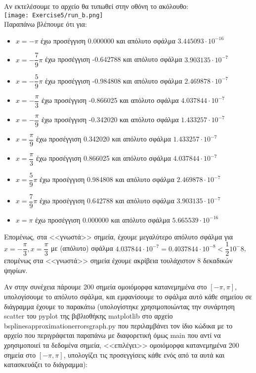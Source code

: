 \documentclass[a4paper,11pt]{article}
\newcommand{\lt}{\latintext}
\begin{document}
\par
Αν εκτελέσουμε το αρχείο θα τυπωθεί στην οθόνη το ακόλουθο:\\
\texttt{[image: Exercise5/run\_b.png]}\\

Παραπάνω βλέπουμε ότι για:\\
\begin{itemize}
    \item {\lt $x = -\pi$} έχω προσέγγιση 0.000000 και απόλυτο σφάλμα $3.445093 \cdot 10^{-16}$
    \item {\lt $x = -\dfrac{7}{9}\pi$} έχω προσέγγιση -0.642788 και απόλυτο σφάλμα $3.903135 \cdot 10^{-7}$
    \item {\lt $x = -\dfrac{5}{9}\pi$} έχω προσέγγιση -0.984808 και απόλυτο σφάλμα $2.469878 \cdot 10^{-7}$
    \item {\lt $x = -\dfrac{\pi}{3}$} έχω προσέγγιση -0.866025 και απόλυτο σφάλμα $4.037844 \cdot 10^{-7}$
    \item {\lt $x = -\dfrac{\pi}{9}$} έχω προσέγγιση -0.342020 και απόλυτο σφάλμα $1.433257 \cdot 10^{-7}$
    \item {\lt $x = \dfrac{\pi}{9}$} έχω προσέγγιση 0.342020 και απόλυτο σφάλμα $1.433257 \cdot 10^{-7}$
    \item {\lt $x = \dfrac{\pi}{3}$} έχω προσέγγιση 0.866025 και απόλυτο σφάλμα $4.037844 \cdot 10^{-7}$
    \item {\lt $x = \dfrac{5}{9}\pi$} έχω προσέγγιση 0.984808 και απόλυτο σφάλμα $2.469878 \cdot 10^{-7}$
    \item {\lt $x = \dfrac{7}{9}\pi$} έχω προσέγγιση 0.642788 και απόλυτο σφάλμα $3.903135 \cdot 10^{-7}$
    \item {\lt $x = \pi$} έχω προσέγγιση 0.000000 και απόλυτο σφάλμα $5.665539 \cdot 10^{-16}$
\end{itemize}

Επομένως, στα <<γνωστά>> σημεία, έχουμε μεγαλύτερο απόλυτο σφάλμα για {\lt $x = -\dfrac{\pi}{3}, x = \dfrac{\pi}{3}$} με (απόλυτο) σφάλμα $4.037844 \cdot 10^{-7} = 0.4037844 \cdot 10^{-8} < \dfrac{1}{2}10^-8$, επομένως στα <<γνωστά>> σημεία έχουμε ακρίβεια τουλάχιστον 8 δεκαδικών ψηφίων.

\par
Αν στην συνέχεια πάρουμε 200 σημεία ομοιόμορφα κατανεμημένα στο $[-\pi, \pi]$, υπολογίσουμε το απόλυτο σφάλμα, και εμφανίσουμε το σφάλμα αυτό κάθε σημείου σε διάγραμμα έχουμε το παρακάτω (υπολογίστηκε χρησιμοποιώντας την συνάρτηση {\lt scatter} του {\lt pyplot} της βιβλιοθήκης {\lt matplotlib} στο αρχείο {\lt b\textunderscore splines\textunderscore approximation\textunderscore errors\textunderscore graph.py} που περιλαμβάνει τον ίδιο κώδικα με το αρχείο που περιγράφεται παραπάνω με διαφορετική όμως {\lt main} που αντί να χρησιμοποιεί τα δεδομένα σημεία, <<επιλέγει>> ομοιόμορφα κατανεμημένα 200 σημεία στο $[-\pi, \pi]$, υπολογίζει τις προσεγγίσεις κάθε ενός από τα αυτά και κατασκευάζει το διάγραμμα):\\
\end{document}
